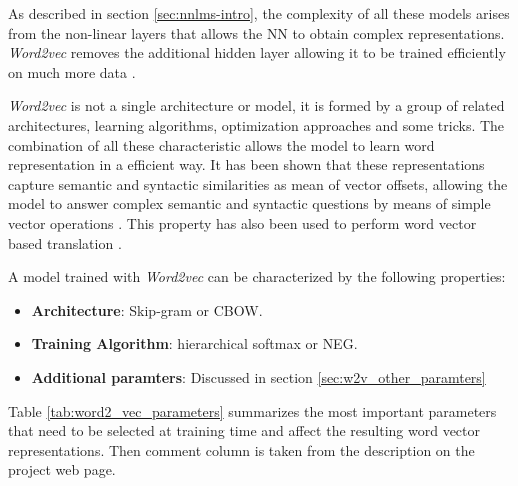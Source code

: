 As  described in section \ref{sec:nnlms-intro}, the complexity of all 
these models arises from the non-linear layers  that allows the \ac{NN} to
obtain complex representations.  \textit{Word2vec} removes the additional
hidden layer  allowing it to be trained efficiently on much more data  \cite{DBLP:journals/corr/abs-1301-3781}.

\textit{Word2vec} is not a single architecture or model, it is formed by a
group of related architectures, learning algorithms, optimization 
approaches and some tricks. The combination of all these characteristic
allows the model  to learn word representation in a efficient
way. It has been shown that these representations  capture semantic and
syntactic 
similarities as mean of vector offsets, allowing the model to answer complex
semantic and syntactic questions by means 
of simple vector operations   \cite{MikolovSCCD13}. This property  has also
been used to perform word vector based translation \cite{DBLP:journals/corr/MikolovLS13}.  

A model trained with \textit{Word2vec}  can be characterized by the following properties:


\begin{itemize}
\item \textbf{Architecture}: Skip-gram or \ac{CBOW}.
\item \textbf{Training Algorithm}: hierarchical softmax  or \ac{NEG}.
\item \textbf{Additional paramters}: Discussed in section \ref{sec:w2v_other_paramters}
\end{itemize}


Table \ref{tab:word2_vec_parameters} summarizes the most important parameters
that need to be selected at training time
and affect the resulting word vector representations. Then comment column is
taken from the description  on the project web page.


